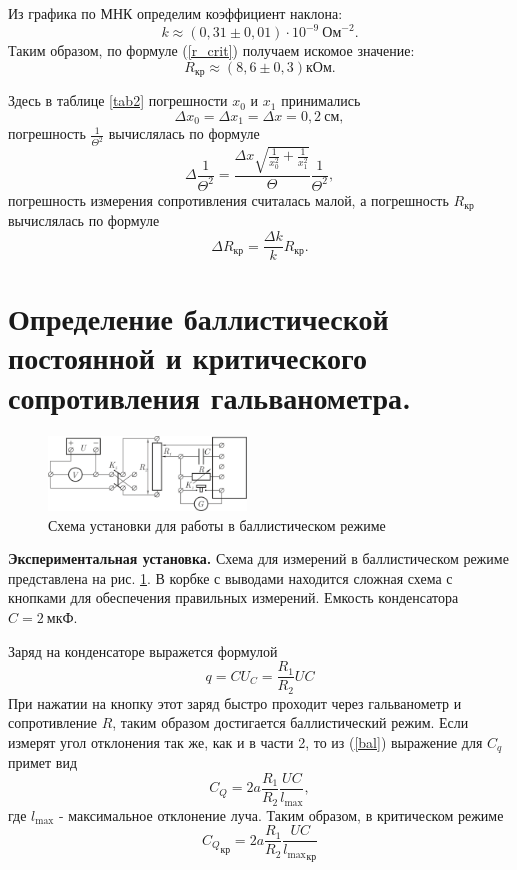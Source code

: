 \documentclass[12pt,a4paper]{article}
\begin{document}
Из графика по МНК определим коэффициент наклона:
\begin{equation}
k \approx (0,31\pm0,01)\cdot 10^{-9}~\text{Ом}^{-2}.\label{k_val}
\end{equation}
Таким образом, по формуле (\ref{r_crit}) получаем искомое значение:
\begin{equation}
R_\text{кр} \approx (8,6 \pm 0,3)\text{кОм}.
\end{equation}

Здесь в таблице \ref{tab2} погрешности $x_0$ и $x_1$ принимались
\begin{equation}
\Delta x_0 = \Delta x_1 = \Delta x = 0,2~\text{см},
\end{equation}
погрешность $\frac{1}{\Theta^2}$ вычислялась по формуле
\begin{equation}
\Delta \frac{1}{\Theta^2} = \frac{\Delta x\sqrt{\frac{1}{x_0^2} + \frac{1}{x_1^2}}}{\Theta}\frac{1}{\Theta^2},
\end{equation}
погрешность измерения сопротивления считалась малой, а погрешность $R_\text{кр}$ вычислялась по формуле
\begin{equation}
\Delta R_\text{кр} = \frac{\Delta k}{k}R_\text{кр}.
\end{equation}
\section{Определение баллистической постоянной и критического сопротивления гальванометра.}
\begin{figure}
\centering\includegraphics[width = 0.47\textwidth]{Sch2}
\captionsetup{justification = centering}
\caption{Схема установки для работы в баллистическом режиме} \label{Fig5}
\end{figure}

\textbf{Экспериментальная установка.} Схема для измерений в баллистическом режиме представлена на рис. \ref{Fig5}. В корбке с выводами находится сложная схема с кнопками для обеспечения правильных измерений. Емкость конденсатора $C = 2~\text{мкФ}$.

Заряд на конденсаторе выражется формулой 
\begin{equation}
q = CU_C = \frac{R_1}{R_2}UC
\end{equation}
При нажатии на кнопку этот заряд быстро проходит через гальванометр и сопротивление $R$, таким образом достигается баллистический режим. Если измерят угол отклонения так же, как и в части 2, то из (\ref{bal}) выражение для $C_q$ примет вид
\begin{equation}
C_Q = 2a\frac{R_1}{R_2}\frac{UC}{l_\text{max}},
\end{equation}
где $l_\text{max}$ - максимальное отклонение луча. Таким образом, в критическом режиме
\begin{equation}
{C_Q}_\text{кр} = 2a\frac{R_1}{R_2}\frac{UC}{{l_\text{max}}_\text{кр}}\label{cqcr}
\end{equation}
\end{document}
